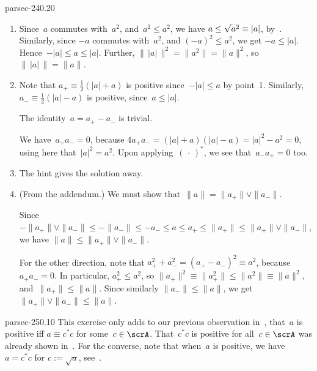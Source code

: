\documentclass[b5page]{book}
\begin{document}
\begin{solution}{parsec-240.20}
\begin{enumerate}
\item
Since~$a$ commutes with~$a^2$,
and~$a^2\leq a^2$,
we have $a\leq \smash{\sqrt{a^2}}\equiv\left|a\right|$,
by~.
Similarly, since $-a$ commutes with~$a^2$,
and $(-a)^2\leq a^2$,
we get $-a\leq \left|a\right|$.
Hence~$-\left|a\right|\leq a\leq \left|a\right|$.
Further, $\|\,\left|a\right|\,\|^2
= \|a^2\|=\|a\|^2$, so~$\|\,\left|a\right|\,\|=\|a\|$.
\item
Note that $a_+\equiv \frac{1}{2}(\left|a\right|+a)$
is positive
since~$-\left|a\right|\leq a$ by point~1.
Similarly, $a_-\equiv \frac{1}{2}(\left|a\right|-a)$
is positive, since~$a\leq \left|a\right|$.

The identity~$a=a_+-a_- $ is trivial.

We have~$a_+a_-=0$, because $4a_+a_- = (\left|a\right|+a)(\left|a\right|-a)
= \left|a\right|^2 - a^2=0$,
using here that~$\left|a\right|^2 = a^2$.
Upon applying~$(\,\cdot\,)^*$,
we see that~$a_-a_+=0$ too.

\item
The hint gives the solution away.

\item
(From the addendum.)
We must show that~$\|a\|=\|a_+\|\vee \|a_-\|$.

Since $-\|a_+\|\vee \|a_-\| 
\leq -\|a_-\| \leq -a_- \leq a \leq
a_+ \leq \|a_+\|\leq \|a_+\|\vee \|a_-\|$,
we have $\|a\|\leq \|a_+\|\vee \|a_-\|$.

For the other direction,
note that $a_+^2 + a_-^2=(a_+-a_-)^2\equiv a^2$,
because $a_+a_-=0$.
In particular, $a_+^2\leq a^2$,
so $\|a_+\|^2 \equiv \|a_+^2\|\leq
\|a^2\|\equiv \|a\|^2$,
and~$\|a_+\|\leq \|a\|$.
Since similarly $\|a_-\|\leq \|a\|$,
we get $\|a_+\|\vee \|a_-\|\leq \|a\|$.
\end{enumerate}
\end{solution}
\begin{solution}{parsec-250.10}
This exercise
only adds to our previous observation
in~,
that~$a$ is positive iff
$a\equiv c^*c$ for some~$c\in\scrA$.
That~$c^*c$ is positive for all~$c\in\scrA$
was already shown in~.
For the converse, note that when~$a$ is positive,
we have $a=c^*c$
for $c:=\sqrt{a}$,
see~.
\end{solution}
\end{document}
